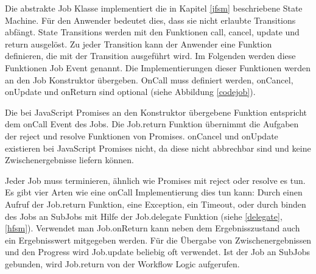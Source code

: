 Die abstrakte Job Klasse implementiert die in Kapitel \ref{jfsm} beschriebene State Machine.
Für den Anwender bedeutet dies, dass sie nicht erlaubte Transitions abfängt.
State Transitions werden mit den Funktionen call, cancel, update und return ausgelöst.
Zu jeder Transition kann der Anwender eine Funktion definieren, die mit der Transition ausgeführt wird.
Im Folgenden werden diese Funktionen Job Event genannt.
Die Implementierungen  dieser Funktionen werden an den Job Konstruktor übergeben.
OnCall muss definiert werden, onCancel, onUpdate und onReturn sind optional (siehe Abbildung \ref{codejob}).


Die bei JavaScript Promises an den Konstruktor übergebene Funktion entspricht dem onCall Event des Jobs.
Die Job.return Funktion übernimmt die Aufgaben der reject und resolve Funktionen von Promises.
onCancel und onUpdate existieren bei JavaScript Promises nicht, da diese nicht abbrechbar sind und keine Zwischenergebnisse liefern können.

Jeder Job muss terminieren, ähnlich wie Promises mit reject oder resolve es tun.
Es gibt vier Arten wie eine onCall Implementierung dies tun kann:
Durch einen Aufruf der Job.return Funktion,
eine Exception,
ein Timeout,
oder durch binden des Jobs an SubJobs mit Hilfe der Job.delegate Funktion (siehe \ref{delegate}, \ref{hfsm}).
Verwendet man Job.onReturn kann neben dem Ergebnisszustand auch ein Ergebnisswert mitgegeben werden.
Für die Übergabe von Zwischenergebnissen und den Progress wird Job.update beliebig oft verwendet.
Ist der Job an SubJobs gebunden, wird Job.return von der Workflow Logic aufgerufen.

\newcommand{\specialcell}[2][c]{%
  \begin{tabular}[#1]{@{}l@{}}#2\end{tabular}}

